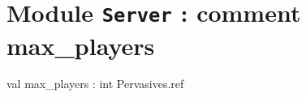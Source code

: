 \documentclass[11pt]{article}
\begin{document}
\tableofcontents
\section{Module {\tt{Server}} : comment max\_players}
\label{module:Server}




\ocamldocvspace{0.5cm}



\label{val:Server.max-underscoreplayers}\begin{ocamldoccode}
val max_players : int Pervasives.ref
\end{ocamldoccode}
\end{document}
